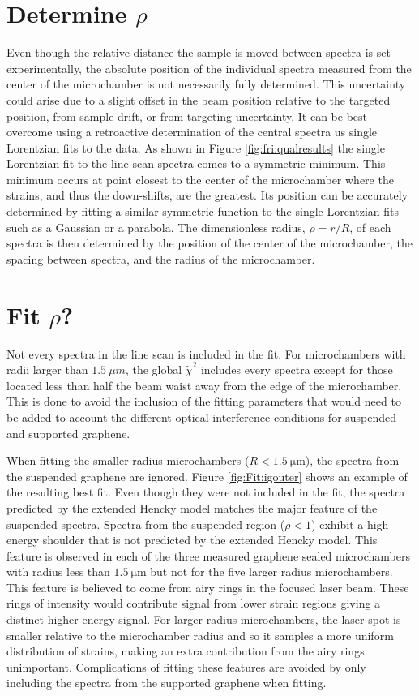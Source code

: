 \section*{Determine $\rho$}
Even though the relative distance the sample is moved between spectra is set experimentally, the absolute position of the individual spectra measured from the center of the microchamber is not necessarily fully determined.
This uncertainty could arise due to a slight offset in the beam position relative to the targeted position, from sample drift, or from targeting uncertainty.
It can be best overcome using a retroactive determination of the central spectra us single Lorentzian fits to the data.
As shown in Figure \ref{fig:fri:qualresults} the single Lorentzian fit to the line scan spectra comes to a symmetric minimum.
This minimum occurs at point closest to the center of the microchamber where the strains, and thus the down-shifts, are the greatest.
Its position can be accurately determined by fitting a similar symmetric function to the single Lorentzian fits such as a Gaussian or a parabola.
The dimensionless radius, $\rho=r/R$, of each spectra is then determined by the position of the center of the microchamber, the spacing between spectra, and the radius of the microchamber.

\section*{Fit $\rho$?}
Not every spectra in the line scan is included in the fit.
For microchambers with radii larger than $1.5 \ \mu m$, the global $\tilde{\chi}^2$ includes every spectra except for those located less than half the beam waist away from the edge of the microchamber.
This is done to avoid the inclusion of the fitting parameters that would need to be added to account the different optical interference conditions for suspended and supported graphene.

When fitting the smaller radius microchambers ($R<1.5 \ \mathrm{\mu m}$), the spectra from the suspended graphene are ignored.
Figure \ref{fig:Fit:igouter} shows an example of the resulting best fit.
Even though they were not included in the fit, the spectra predicted by the extended Hencky model matches the major feature of the suspended spectra.
Spectra from the suspended region ($\rho<1$) exhibit a high energy shoulder that is not predicted by the extended Hencky model.
This feature is observed in each of the three measured graphene sealed microchambers with radius less than $1.5 \ \mathrm{\mu m}$ but not for the five larger radius microchambers.
This feature is believed to come from airy rings in the focused laser beam.
These rings of intensity would contribute signal from lower strain regions giving a distinct higher energy signal.
For larger radius microchambers, the laser spot is smaller relative to the microchamber radius and so it samples a more uniform distribution of strains, making an extra contribution from the airy rings unimportant.
Complications of fitting these features are avoided by only including the spectra from the supported graphene when fitting.

